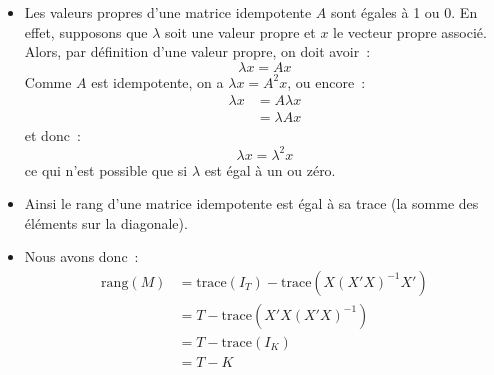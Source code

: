 \documentclass[10pt]{beamer}
\theoremstyle{plain}
\begin{document}
\begin{notes}

  \begin{itemize}

  \item Les valeurs propres d'une matrice idempotente $A$ sont égales à 1 ou 0. En effet, supposons que $\lambda$ soit une valeur propre et $x$ le vecteur propre associé. Alors, par définition d'une valeur propre, on doit avoir~:
    \[
      \lambda x = A x
    \]
    Comme $A$ est idempotente, on a $\lambda x = A^2 x$, ou encore~:
    \[
      \begin{split}
        \lambda x &= A \lambda x\\
        &= \lambda A x
      \end{split}
    \]
    et donc~:
    \[
      \lambda x = \lambda^2 x
    \]
    ce qui n'est possible que si $\lambda$ est égal à un ou zéro.\newline

  \item Ainsi le rang d'une matrice idempotente est égal à sa trace (la somme des éléments sur la diagonale).\newline

  \item Nous avons donc~:
    \[
      \begin{split}
        \mathrm{rang}(M) &= \mathrm{trace}(I_T) - \mathrm{trace}\left( X(X'X)^{-1}X' \right)\\
                         &= T - \mathrm{trace}\left( X'X(X'X)^{-1} \right)\\
                         &= T - \mathrm{trace}\left(I_K\right)\\
        &= T-K
      \end{split}
  \]
  \end{itemize}

\end{notes}
\end{document}
